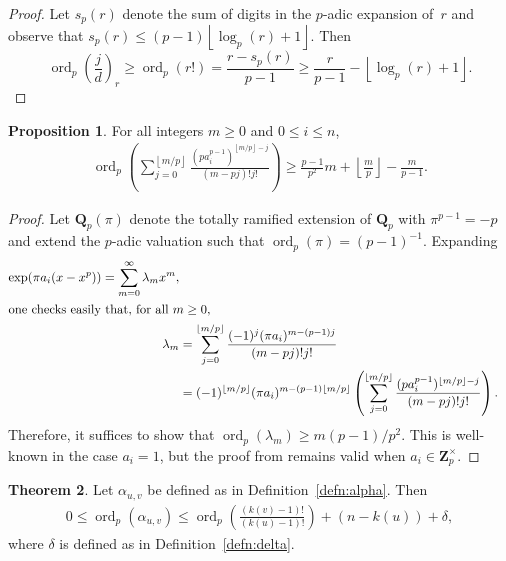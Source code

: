 \documentclass[a4paper,11pt]{article}
\numberwithin{equation}{section}
\providecommand{\floor}[1]{\left\lfloor#1\right\rfloor}   %
\newcommand{\ZZ}{\mathbf{Z}} %
\newcommand{\QQ}{\mathbf{Q}} %
\DeclareMathOperator{\ord}{ord}          %
\theoremstyle{definition}
\newtheorem{thm}{Theorem}[section]
\newtheorem{prop}[thm]{Proposition}
\begin{document}
\begin{proof}
Let $s_p(r)$ denote the sum of digits in the $p$-adic expansion of~$r$ 
and observe that $s_p(r) \leq (p-1)\floor{\log_p(r) + 1}$. Then 
\begin{equation*}
\ord_p\left(\frac{j}{d}\right)_r \geq \ord_p(r!) 
    = \frac{r - s_p(r)}{p-1} \geq \frac{r}{p-1} - \floor{\log_p(r) + 1}.
\end{equation*}
\end{proof}

\begin{prop} \label{prop:coefbound}
For all integers $m \geq 0$ and $0 \leq i \leq n$,
\begin{align*}
\ord_p \left( \sum_{j=0}^{\floor{m/p}} \frac{(p a_i^{p-1})^{\floor{m/p}-j}}{(m-pj)!j!} \right) \geq \frac{p-1}{p^2}m + \floor{\frac{m}{p}}-\frac{m}{p-1}.
\end{align*}
\end{prop}
\begin{proof}
Let $\QQ_p(\pi)$ denote the totally ramified extension of $\QQ_p$ with $\pi^{p-1} = -p$ and extend the $p$-adic valuation such that \mbox{$\ord_p(\pi) = (p-1)^{-1}$}. 
Expanding
\begin{align*}
\exp(\pi a_i(x-x^p)) = \sum_{m=0}^{\infty} \lambda_m x^m, \\
\intertext{one checks easily that, for all $m \geq 0$,}
\lambda_m &= \sum_{j=0}^{\floor{m/p}} \frac{(-1)^j (\pi a_i)^{m-(p-1)j}}{(m-pj)!j!} \\
          &= (-1)^{\floor{m/p}} (\pi a_i)^{m-(p-1)\floor{m/p}} \left( \sum_{j=0}^{\floor{m/p}} \frac{(p a_i^{p-1})^{\floor{m/p}-j}}{(m-pj)!j!} \right).
\end{align*}
Therefore, it suffices to show that $\ord_p(\lambda_m) \geq m (p-1)/p^2$. This is well-known in the case $a_i=1$,
but the proof from \citep[Lemma 4.1]{dwork1962} remains valid when $a_i \in \ZZ_p^{\times}$. 
\end{proof}

\begin{thm} \label{thm:alphabound} Let $\alpha_{u,v}$ be defined as in Definition~\ref{defn:alpha}. Then
\begin{align*}
0 \leq \ord_p(\alpha_{u,v}) \leq \ord_p\left( \frac{(k(v)-1)!}{(k(u)-1)!} \right)+(n-k(u))+\delta,
\end{align*}
where $\delta$ is defined as in Definition~\ref{defn:delta}. 
\end{thm}
\end{document}
